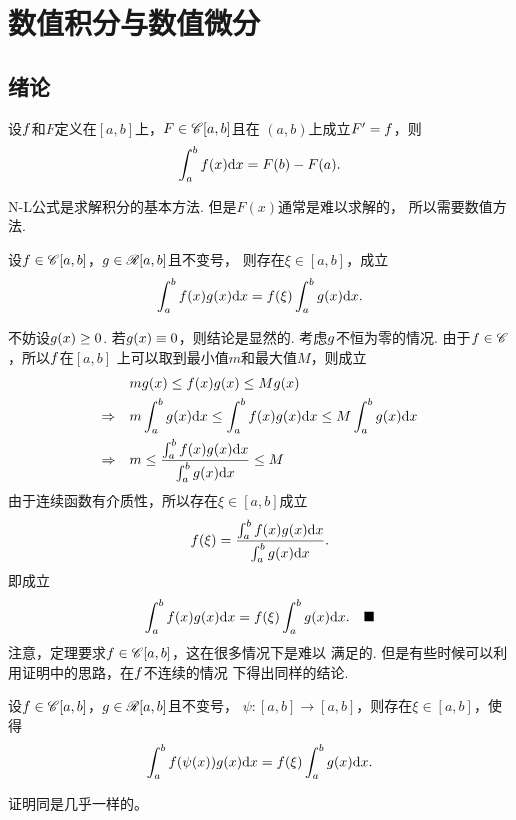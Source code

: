 \section{数值积分与数值微分}
\subsection{绪论}
  \begin{thm}[N-L公式]
    设$\mathnormal{f}$和$F$定义在$[a, b]$上，$F \in \mathscr{C}[a, b]$且在
    $(a, b)$上成立$F^\prime=\mathnormal{f}$，则
    \[
      \int_a^b \mathnormal{f}(x)\mathrm{d} x = F(b) - F(a).
    \]
  \end{thm}
  \remark
    N-L公式是求解积分的基本方法. 但是$F(x)$通常是难以求解的，
    所以需要数值方法.

  \begin{thm}[积分第一中值定理]
    \label{thm: 积分第一中值定理}
    设$\mathnormal{f}\in\mathscr{C}[a, b]$，$\mathnormal{g}\in\mathscr{R}[a, b]$且不变号，
    则存在$\xi\in[a, b]$，成立
    \[
      \int_a^b\mathnormal{f}(x)\mathnormal{g}(x)\mathrm{d} x = \mathnormal{f}(\xi)\int_a^b\mathnormal{g}(x)\mathrm{d} x.
    \]
  \end{thm}
  \proof
    不妨设$\mathnormal{g}(x)\ge 0$. 若$\mathnormal{g}(x)\equiv 0$，则结论是显然的.
    考虑$\mathnormal{g}$不恒为零的情况. 由于$\mathnormal{f}\in\mathscr{C}$，所以$\mathnormal{f}$在$[a,b]$
    上可以取到最小值$m$和最大值$M$，则成立
    \[\begin{split}
      & m\mathnormal{g}(x) \le \mathnormal{f}(x)\mathnormal{g}(x) \le M\mathnormal{g}(x) \\
      \Rightarrow \quad &
      m\int_a^b\mathnormal{g}(x)\mathrm{d} x \le \int_a^b\mathnormal{f}(x)\mathnormal{g}(x)\mathrm{d} x
      \le M\int_a^b\mathnormal{g}(x)\mathrm{d} x \\
      \Rightarrow \quad &
      m \le \frac{\int_a^b\mathnormal{f}(x)\mathnormal{g}(x)\mathrm{d} x}{\int_a^b\mathnormal{g}(x)\mathrm{d} x}
      \le M
    \end{split}\]
    由于连续函数有介质性，所以存在$\xi\in[a, b]$成立
    \[
      \mathnormal{f}(\xi) = \frac{\int_a^b\mathnormal{f}(x)\mathnormal{g}(x)\mathrm{d} x}{\int_a^b\mathnormal{g}(x)\mathrm{d} x}.
    \]
    即成立
    \[
      \int_a^b\mathnormal{f}(x)\mathnormal{g}(x)\mathrm{d} x = \mathnormal{f}(\xi)\int_a^b\mathnormal{g}(x)\mathrm{d} x.
      \quad\blacksquare
    \]
  \remark
    注意，定理要求$\mathnormal{f}\in\mathscr{C}[a, b]$，这在很多情况下是难以
    满足的. 但是有些时候可以利用证明中的思路，在$\mathnormal{f}$不连续的情况
    下得出同样的结论.

  \begin{pos}
    \label{pos: 积分第一中值定理2}
    设$\mathnormal{f}\in\mathscr{C}[a, b]$，$\mathnormal{g}\in\mathscr{R}[a, b]$且不变号，
    $\psi:[a, b]\to[a, b]$，则存在$\xi\in[a, b]$，使得
    \[
      \int_a^b\mathnormal{f}(\psi(x))\mathnormal{g}(x)\mathrm{d} x =
      \mathnormal{f}(\xi)\int_a^b\mathnormal{g}(x)\mathrm{d} x.
    \]
  \end{pos}
  \remark
    证明同是几乎一样的。

